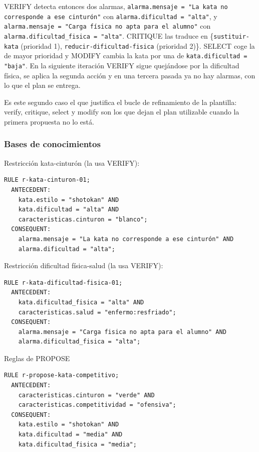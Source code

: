 \documentclass[12pt,a4paper,twoside,spanish]{article}      %
\begin{document}
VERIFY detecta entonces dos alarmas,
\texttt{alarma.mensaje = "La kata no corresponde a ese cinturón"} con
\texttt{alarma.dificultad = "alta"}, y \texttt{alarma.mensaje = "Carga
física no apta para el alumno"} con \texttt{alarma.dificultad\_fisica =
"alta"}. CRITIQUE las traduce en \{\texttt{sustituir-kata} (prioridad 1),
\texttt{reducir-dificultad-fisica} (prioridad 2)\}. SELECT coge la de
mayor prioridad y MODIFY cambia la kata por una de
\texttt{kata.dificultad = "baja"}. En la siguiente iteración VERIFY sigue
quejándose por la dificultad física, se aplica la segunda acción y en
una tercera pasada ya no hay alarmas, con lo que el plan se entrega.

Es este segundo caso el que justifica el bucle de refinamiento de la
plantilla: verify, critique, select y modify son los que dejan el plan
utilizable cuando la primera propuesta no lo está.





\subsubsection{Bases de conocimientos}

Restricción kata-cinturón (la usa VERIFY):
\begin{verbatim}
RULE r-kata-cinturon-01;
  ANTECEDENT:
    kata.estilo = "shotokan" AND
    kata.dificultad = "alta" AND
    caracteristicas.cinturon = "blanco";
  CONSEQUENT:
    alarma.mensaje = "La kata no corresponde a ese cinturón" AND
    alarma.dificultad = "alta";
\end{verbatim}

Restricción dificultad física-salud (la usa VERIFY):
\begin{verbatim}
RULE r-kata-dificultad-fisica-01;
  ANTECEDENT:
    kata.dificultad_fisica = "alta" AND
    caracteristicas.salud = "enfermo:resfriado";
  CONSEQUENT:
    alarma.mensaje = "Carga fisica no apta para el alumno" AND
    alarma.dificultad_fisica = "alta";
\end{verbatim}
Reglas de PROPOSE
\begin{verbatim}
RULE r-propose-kata-competitivo;
  ANTECEDENT:
    caracteristicas.cinturon = "verde" AND
    caracteristicas.competitividad = "ofensiva";
  CONSEQUENT:
    kata.estilo = "shotokan" AND
    kata.dificultad = "media" AND
    kata.dificultad_fisica = "media";
\end{verbatim}
\end{document}
